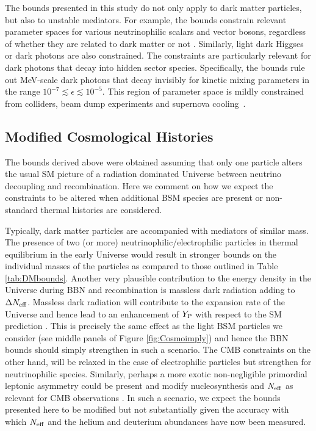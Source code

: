 The bounds presented in this study do not only apply to dark matter particles, but also to unstable mediators. For example, the bounds constrain relevant parameter spaces for various neutrinophilic scalars and vector bosons, regardless of whether they are related to dark matter \cite{Blennow:2019fhy,Kelly:2019wow} or not \cite{Blinov:2019gcj}. Similarly, light dark Higgses or dark photons are also constrained. The constraints are particularly relevant for dark photons that decay into hidden sector species. Specifically, the bounds rule out MeV-scale dark photons that decay invisibly for kinetic mixing parameters in the range $10^{-7} \lesssim \epsilon \lesssim 10^{-5}$. This region of parameter space is mildly constrained from colliders, beam dump experiments and supernova cooling~\cite{Ilten:2018crw,Bauer:2018onh,Chang:2018rso}. 

\subsection{Modified Cosmological Histories} 

The bounds derived above were obtained assuming that only one particle alters the usual SM picture of a radiation dominated Universe between neutrino decoupling and recombination. Here we comment on how we expect the constraints to be altered when additional BSM species are present or non-standard thermal histories are considered.  

Typically, dark matter particles are accompanied with mediators of similar mass. The presence of two (or more) neutrinophilic/electrophilic particles in thermal equilibrium in the early Universe would result in stronger bounds on the individual masses of the particles as compared to those outlined in Table \ref{tab:DMbounds}. Another very plausible contribution to the energy density in the Universe during BBN and recombination is massless dark radiation adding to $\Delta N_{\rm eff}$. Massless dark radiation will contribute to the expansion rate of the Universe and hence lead to an enhancement of $Y_{\rm P}$ with respect to the SM prediction \cite{Sarkar:1995dd,Iocco:2008va,Pospelov:2010hj}. This is precisely the same effect as the light BSM particles we consider (see middle panels of Figure \ref{fig:Cosmoimply}) and hence the BBN bounds should simply strengthen in such a scenario. The CMB constraints on the other hand, will be relaxed in the case of electrophilic particles \cite{Steigman:2013yua} but strengthen for neutrinophilic species. Similarly, perhaps a more exotic non-negligible primordial leptonic asymmetry could be present and modify nucleosynthesis and $N_{\rm eff}$ as relevant for CMB observations \cite{Dolgov:2002wy}. In such a scenario, we expect the bounds presented here to be modified \cite{Berezhiani:2012ru} but not substantially given the accuracy with which $N_{\rm eff}$ and the helium and deuterium abundances have now been measured.

